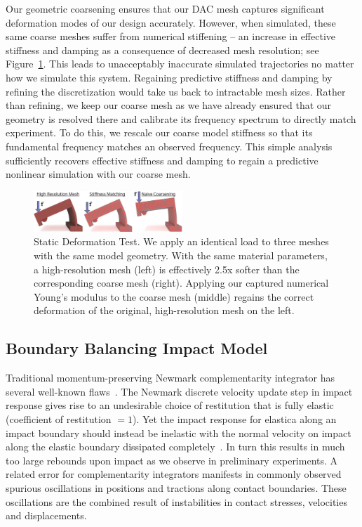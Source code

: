 Our geometric coarsening ensures that our DAC mesh captures significant deformation modes of our design accurately.
However, when simulated, these same coarse meshes suffer from numerical stiffening -- an increase in effective stiffness and damping as a consequence of decreased mesh resolution; see Figure~\ref{fig:numerical_stiffness}.
This leads to unacceptably inaccurate simulated trajectories no matter how we simulate this system.
Regaining predictive stiffness and damping by refining the discretization would take us back to intractable mesh sizes.
Rather than refining, we keep our coarse mesh as we have already ensured that our geometry is resolved there and calibrate its frequency spectrum to directly match experiment.
To do this, we rescale our coarse model stiffness so that its fundamental frequency matches an observed frequency. This simple analysis sufficiently recovers effective stiffness and damping to regain a predictive 
nonlinear simulation with our coarse mesh.
\begin{figure}[h]
	\centering
	\includegraphics[width=0.5\textwidth]{images/stiffness.pdf}
	\caption{Static Deformation Test. We apply an identical load to three meshes with the same model geometry. With the same material parameters, a high-resolution mesh (left) is effectively 2.5x softer than the corresponding coarse mesh (right). Applying our captured numerical Young's modulus to the coarse mesh (middle) regains the correct deformation of the original, high-resolution mesh on the left.}
	\label{fig:numerical_stiffness}
\end{figure}
\subsection{Boundary Balancing Impact Model}
Traditional momentum-preserving Newmark complementarity integrator has several well-known flaws~\cite{Deuflhard:2008fu}. The Newmark discrete velocity update step in impact response gives rise to an undesirable choice of restitution that is fully elastic (coefficient of restitution $= 1$).
Yet the impact response for elastica along an impact boundary should instead be inelastic with the normal velocity on impact along the elastic boundary dissipated completely~\cite{Doyen:2011gka}.
In turn this results in much too large rebounds upon impact as we observe in preliminary experiments.
A related error for complementarity integrators manifests in commonly observed spurious oscillations in positions and tractions along contact boundaries.
These oscillations are the combined result of instabilities in contact stresses, velocities and displacements.


